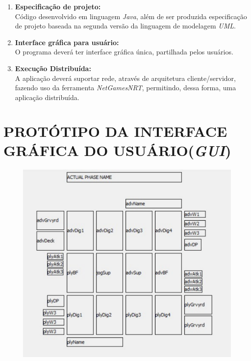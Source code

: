 \documentclass[12pt,a4paper,brazil,abntex2]{article}
\begin{document}
		\begin{enumerate}

			\item {\bf Especificação de projeto:}\\Código desenvolvido em linguagem \textit{Java}, além de ser produzida especificação de projeto baseada na segunda versão da linguagem de modelagem \textit{UML}.

			\item {\bf Interface gráfica para usuário:}\\O programa deverá ter interface gráfica única, partilhada pelos usuários.
			
			\item {\bf Execução Distribuída:}\\ A aplicação deverá suportar rede, através de arquitetura cliente/servidor, fazendo uso da ferramenta \textit{NetGamesNRT}, permitindo, dessa forma, uma aplicação distribuída.
		\end{enumerate}
\newpage

\section{\normalsize PROTÓTIPO DA INTERFACE GRÁFICA DO USUÁRIO(\textit{GUI})}
	
	\begin{figure}[h]
	\includegraphics[scale=1]{Prototipo-GUI.pdf}
	\end{figure}
\end{document}
